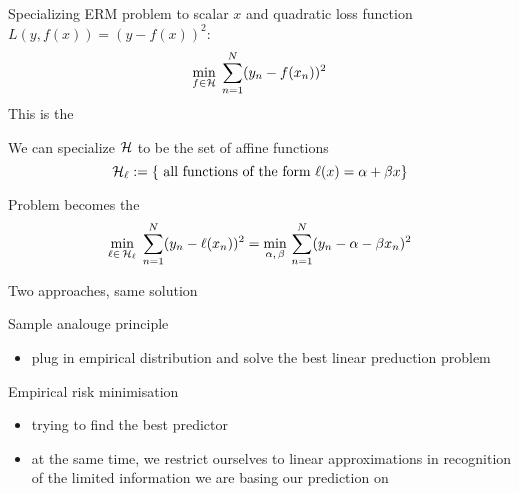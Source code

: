 \begin{frame}

    \vspace{2em}
    \Eg
    Specializing ERM problem to scalar $x$ and quadratic 
    loss function $L(y, f(x)) = (y - f(x))^2$:
    \begin{equation*}
        \label{eq:ermlsq}
        \min_{f \in \mathcal H} \; \sum_{n=1}^N (y_n - f(x_n))^2
    \end{equation*}
    This is the 
    
    \vspace{.7em}
    We can specialize $\mathcal H$ to be the set of affine functions
    \begin{equation}
        \label{eq:allaff}
        \mathcal{H}_{\ell} := \{ \text{ all functions of the form } \ell(x) = \alpha + \beta x \}
    \end{equation}
    
\end{frame}

\begin{frame}

    \vspace{2em}
    Problem becomes the  
    \begin{equation}
        \label{eq:llsp}
        \min_{\ell \in \, \mathcal{H}_{\ell}} \; \sum_{n=1}^N (y_n - \ell(x_n))^2
        = \min_{\alpha, \, \beta } \, \sum_{n=1}^N  (y_n - \alpha - \beta x_n)^2  
    \end{equation}
    
\end{frame}

\begin{frame}
    
    \vspace{2em}
    Two approaches, same solution
    
    Sample analouge principle
    \begin{itemize}
        \item plug in empirical distribution and solve the best 
            linear preduction problem 
    \end{itemize}
    
    \vspace{.7em}
    Empirical risk minimisation 
    \begin{itemize}
        \item trying to find
            the best predictor
        \item at the same time, we restrict ourselves to linear
            approximations in recognition of the
            limited information we are basing our prediction on 
    \end{itemize}
    
\end{frame}

